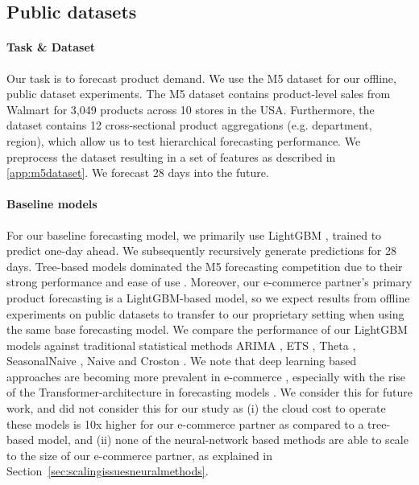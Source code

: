 \documentclass[preprint, 3p, times, twocolumn]{elsarticle}
\begin{document}
  \subsection{Public datasets} \label{subsec:publicdatasets}
  \paragraph{Task \& Dataset} Our task is to forecast product demand. We use the M5 dataset \cite{makridakis_m5_2021} for our offline, public dataset experiments. The M5 dataset contains product-level sales from Walmart for 3,049 products across 10 stores in the USA. Furthermore, the dataset contains 12 cross-sectional product aggregations (e.g. department, region), which allow us to test hierarchical forecasting performance. We preprocess the dataset resulting in a set of features as described in \ref{app:m5dataset}. We forecast 28 days into the future.
  
  \paragraph{Baseline models} For our baseline forecasting model, we primarily use LightGBM \cite{ke_lightgbm_2017}, trained to predict one-day ahead. We subsequently recursively generate predictions for 28 days. Tree-based models dominated the M5 forecasting competition due to their strong performance and ease of use \cite{makridakis_m5_2022,januschowski_forecasting_2022}. Moreover, our e-commerce partner's primary product forecasting is a LightGBM-based model, so we expect results from offline experiments on public datasets to transfer to our proprietary setting when using the same base forecasting model. We compare the performance of our LightGBM models against traditional statistical methods ARIMA \cite{box_distribution_1970}, ETS \cite{hyndman_forecasting_2008}, Theta \cite{assimakopoulos_theta_2000}, SeasonalNaive \cite{hyndman_forecasting_2021}, Naive \cite{hyndman_forecasting_2021} and Croston \cite{croston_forecasting_1972}. 
  We note that deep learning based approaches are becoming more prevalent in e-commerce \cite{kunz_deep_2023}, especially with the rise of the Transformer-architecture in forecasting models \cite{lim_temporal_2021,li_enhancing_2019}. We consider this for future work, and did not consider this for our study as (i) the cloud cost to operate these models is 10x higher for our e-commerce partner as compared to a tree-based model, and (ii) none of the neural-network based methods are able to scale to the size of our e-commerce partner, as explained in Section~\ref{sec:scalingissuesneuralmethods}. 
\end{document}
